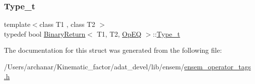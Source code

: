 \subsubsection{\texorpdfstring{Type\_t}{Type\_t}\hspace{0.1cm}{\footnotesize\ttfamily [2/2]}}
{\footnotesize\ttfamily template$<$class T1 , class T2 $>$ \\
typedef bool \mbox{\hyperlink{structBinaryReturn}{Binary\+Return}}$<$ T1, T2, \mbox{\hyperlink{structOpEQ}{Op\+EQ}} $>$\+::\mbox{\hyperlink{structBinaryReturn_3_01T1_00_01T2_00_01OpEQ_01_4_a9dae4026d9a8e83b1f6b0d130201d5f5}{Type\+\_\+t}}}



The documentation for this struct was generated from the following file\+:\begin{DoxyCompactItemize}
\item 
/\+Users/archanar/\+Kinematic\+\_\+factor/adat\+\_\+devel/lib/ensem/\mbox{\hyperlink{lib_2ensem_2ensem__operator__tags_8h}{ensem\+\_\+operator\+\_\+tags.\+h}}\end{DoxyCompactItemize}

